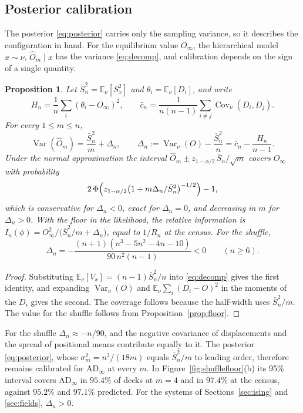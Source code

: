 \documentclass[ba]{imsart}
\theoremstyle{plain}
\newtheorem{proposition}[theorem]{Proposition}
\theoremstyle{definition}
\newcommand{\E}{\mathbb{E}}
\newcommand{\Var}{\operatorname{Var}}
\newcommand{\Cov}{\operatorname{Cov}}
\newcommand{\AD}{\mathrm{AD}}
\newcommand{\Oh}{\widehat{O}}
\begin{document}
\subsection{Posterior calibration}

The posterior \eqref{eq:posterior} carries only the sampling variance, so it describes the configuration in hand. For the equilibrium value $O_\infty$, the hierarchical model $x\sim\nu$, $\Oh_m\mid x$ has the variance \eqref{eq:decomp}, and calibration depends on the sign of a single quantity.

\begin{proposition}\label{prop:calib}
Let $\bar S_n^2=\E_\nu[S_x^2]$ and $\theta_i=\E_\nu[D_i]$, and write
\[
H_n=\frac1n\sum_i(\theta_i-O_\infty)^2,\qquad\bar c_n=\frac{1}{n(n-1)}\sum_{i\ne j}\Cov_\nu(D_i,D_j).
\]
For every $1\le m\le n$,
\begin{equation}\label{eq:Sbar}
\Var(\Oh_m)=\frac{\bar S_n^2}{m}+\Delta_n,\qquad\Delta_n:=\Var_\nu(O)-\frac{\bar S_n^2}{n}=\bar c_n-\frac{H_n}{n-1}.
\end{equation}
Under the normal approximation the interval $\Oh_m\pm z_{1-\alpha/2}\,\bar S_n/\sqrt m$ covers $O_\infty$ with probability
\begin{equation}\label{eq:coverage}
2\,\Phi\Bigl(z_{1-\alpha/2}\bigl(1+m\Delta_n/\bar S_n^2\bigr)^{-1/2}\Bigr)-1,
\end{equation}
which is conservative for $\Delta_n<0$, exact for $\Delta_n=0$, and decreasing in $m$ for $\Delta_n>0$. With the floor in the likelihood, the relative information is $I_n(\phi)=O_\infty^2/\bigl(\bar S_n^2/m+\Delta_n\bigr)$, equal to $1/R_n$ at the census. For the shuffle,
\begin{equation}\label{eq:Delta}
\Delta_n=-\frac{(n+1)(n^3-5n^2-4n-10)}{90\,n^2(n-1)}<0\qquad(n\ge6).
\end{equation}
\end{proposition}

\begin{proof}
Substituting $\E_\nu[V_x]=(n-1)\bar S_n^2/n$ into \eqref{eq:decomp} gives the first identity, and expanding $\Var_\nu(O)$ and $\E_\nu\sum_i(D_i-O)^2$ in the moments of the $D_i$ gives the second. The coverage follows because the half-width uses $\bar S_n^2/m$. The value for the shuffle follows from Proposition~\ref{prop:floor}.
\end{proof}

For the shuffle $\Delta_n\approx-n/90$, and the negative covariance of displacements and the spread of positional means contribute equally to it. The posterior \eqref{eq:posterior}, whose $\sigma_m^2=n^2/(18m)$ equals $\bar S_n^2/m$ to leading order, therefore remains calibrated for $\AD_\infty$ at every $m$. In Figure~\ref{fig:shufflefloor}(b) its 95\% interval covers $\AD_\infty$ in $95.4\%$ of decks at $m=4$ and in $97.4\%$ at the census, against $95.2\%$ and $97.1\%$ predicted. For the systems of Sections~\ref{sec:ising} and \ref{sec:fields}, $\Delta_n>0$.
\end{document}
